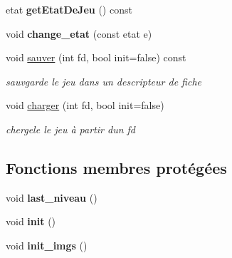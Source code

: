 \begin{DoxyCompactItemize}
\mbox{\label{class_jeu_ac9bdb00e9ee579e545cc2dac53baae32}} 
etat {\bfseries get\+Etat\+De\+Jeu} () const
\item 
\mbox{\label{class_jeu_a54aba3b532871e2289771a3dd8eb724d}} 
void {\bfseries change\+\_\+etat} (const etat e)
\item 
\mbox{\label{class_jeu_a9def994dba2ad4cb6f7624f094d1a505}} 
void \mbox{\hyperlink{class_jeu_a9def994dba2ad4cb6f7624f094d1a505}{sauver}} (int fd, bool init=false) const
\begin{DoxyCompactList}\small\item\em sauvgarde le jeu dans un descripteur de fiche \end{DoxyCompactList}\item 
\mbox{\label{class_jeu_a924b69b4796f7b91364655c2e43c480b}} 
void \mbox{\hyperlink{class_jeu_a924b69b4796f7b91364655c2e43c480b}{charger}} (int fd, bool init=false)
\begin{DoxyCompactList}\small\item\em chergele le jeu à partir d\textquotesingle{}un fd \end{DoxyCompactList}\end{DoxyCompactItemize}
\subsection*{Fonctions membres protégées}
\begin{DoxyCompactItemize}
\item 
\mbox{\label{class_jeu_aa5d49db4201091d7a31c6400b43db24e}} 
void {\bfseries last\+\_\+niveau} ()
\item 
\mbox{\label{class_jeu_af8832b6cdb31f97f5dec8ed4e38a5200}} 
void {\bfseries init} ()
\item 
\mbox{\label{class_jeu_a8a1df4e7132f36eaae7fe60807a08a90}} 
void {\bfseries init\+\_\+imgs} ()
\end{DoxyCompactItemize}
